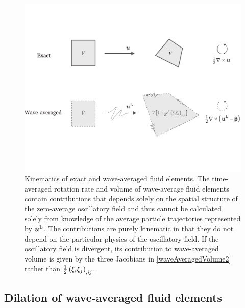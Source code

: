 \documentclass[12pt, oneside]{book}
\begin{document}
\begin{figure}
\centering
\includegraphics[width = 1\textwidth]{meanFluidElement}
\caption[Kinematics of exact and wave-averaged fluid elements.]{Kinematics of exact and wave-averaged fluid elements.  The time-averaged rotation rate and volume of wave-average fluid elements contain contributions that depends solely on the spatial structure of the zero-average oscillatory field and thus cannot be calculated solely from knowledge of the average particle trajectories represented by $\boldsymbol{u}^{\mathrm{L}}$.  The contributions are purely kinematic in that they do not depend on the particular physics of the oscillatory field.  If the oscillatory field is divergent, its contribution to wave-averaged volume is given by the three Jacobians in \eqref{waveAveragedVolume2} rather than $\tfrac{1}{2} \left ( \xi_i \xi_j \right )_{,ij}$.}
\label{meanFluidElements}
\end{figure}

\subsection{Dilation of wave-averaged fluid elements}
\label{waveAveragedVolumes}
\end{document}
